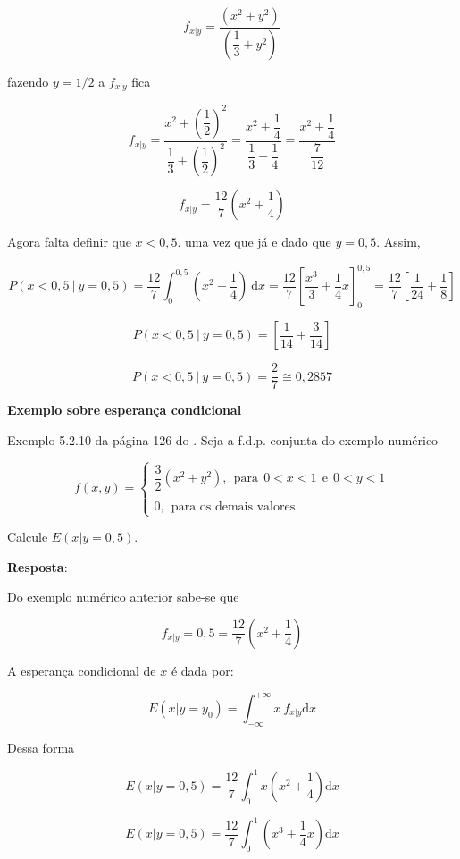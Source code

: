 \documentclass[
]{book}
\begin{document}
\[
  f_{x|y} = \dfrac{(x^2 + y^2)}{\left( \dfrac{1}{3} + y^2 \right)}
\]

fazendo \(y=1/2\) a \(f_{x|y}\) fica

\[
  f_{x|y} = \dfrac{x^2 + \left( \dfrac{1}{2}\right)^2}{ \dfrac{1}{3} + \left( \dfrac{1}{2} \right)^2} =  \dfrac{x^2 + \dfrac{1}{4}}{ \dfrac{1}{3} + \dfrac{1}{4}} = \dfrac{x^2 + \dfrac{1}{4}}{ \dfrac{7}{12}}
\]

\[
  f_{x|y} = \dfrac{12}{7}\left(x^2 + \dfrac{1}{4}\right)
\]

Agora falta definir que \(x<0,5\). uma vez que já e dado que \(y=0,5\). Assim,

\[
P(x<0,5~|~y=0,5) = \dfrac{12}{7} \int_{0}^{0,5}\left(x^2 + \dfrac{1}{4}\right)~\text{d}x = \dfrac{12}{7} \left[\dfrac{x^3}{3} + \dfrac{1}{4}x  \right]_{0}^{0,5} =  \dfrac{12}{7} \left[\dfrac{1}{24} + \dfrac{1}{8} \right] 
\]

\[
P(x<0,5~|~y=0,5) = \left[\dfrac{1}{14} + \dfrac{3}{14} \right] 
\]

\[
P(x<0,5~|~y=0,5) = \dfrac{2}{7} \cong 0,2857 
\]

\textbf{Exemplo sobre esperança condicional}

Exemplo 5.2.10 da página 126 do \citet{Sartoris2013}. Seja a f.d.p. conjunta do exemplo numérico

\begin{equation}
  f(x,y) = 
    \begin{cases}
      \dfrac{3}{2}\left( x^2 + y^2 \right),~~\text{para}~~0 < x < 1~~\text{e}~~0 < y < 1 \\
      \\
      0, ~~\text{para os demais valores}
    \end{cases}
\end{equation}

Calcule \(E(x|y=0,5)\).

\textbf{Resposta}:

Do exemplo numérico anterior sabe-se que

\[
  f_{x|y} = 0,5 = \dfrac{12}{7}\left( x^2 + \dfrac{1}{4}  \right)
\]

A esperança condicional de \(x\) é dada por:

\[
  E(x|y=y_0) = \int_{-\infty}^{+\infty}x~f_{x|y} \text{d}x
\]

Dessa forma

\[
  E(x|y=0,5) = \dfrac{12}{7}\int_{0}^{1}x\left( x^2 + \dfrac{1}{4} \right)\text{d}x
\]

\[
  E(x|y=0,5) = \dfrac{12}{7}\int_{0}^{1}\left( x^3 + \dfrac{1}{4}x \right)\text{d}x
\]
\end{document}
